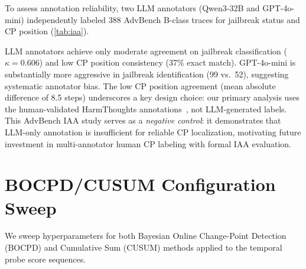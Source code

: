 To assess annotation reliability, two LLM annotators (Qwen3-32B and GPT-4o-mini) independently labeled 388 AdvBench B-class traces for jailbreak status and CP position (\cref{tab:iaa}).

\begin{table}[h!]
\centering
\small
\caption{Inter-annotator agreement on AdvBench B-class traces (388 total). CP position metrics computed on 51 traces where both annotators identified a jailbreak.}
\label{tab:iaa}
\end{table}

LLM annotators achieve only moderate agreement on jailbreak classification ($\kappa{=}0.606$) and low CP position consistency (37\% exact match). GPT-4o-mini is substantially more aggressive in jailbreak identification (99 vs.\ 52), suggesting systematic annotator bias. The low CP position agreement (mean absolute difference of 8.5 steps) underscores a key design choice: our primary analysis uses the human-validated HarmThoughts annotations~\citep{harmthoughts}, not LLM-generated labels. This AdvBench IAA study serves as a \emph{negative control}: it demonstrates that LLM-only annotation is insufficient for reliable CP localization, motivating future investment in multi-annotator human CP labeling with formal IAA evaluation.

\section{BOCPD/CUSUM Configuration Sweep}
\label{app:bocpd_config}

We sweep hyperparameters for both Bayesian Online Change-Point Detection (BOCPD) and Cumulative Sum (CUSUM) methods applied to the temporal probe score sequences.

